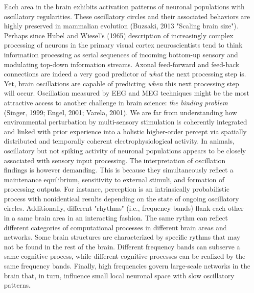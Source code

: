\documentclass[authoryear,review,3p]{elsarticle}
\begin{document}
Each area in the brain exhibits
activation patterns of neuronal populations with
oscillatory regularities.
These oscillatory circles and their associated behaviors are
highly preserved in mammalian evolution
(Buzsaki, 2013 "Scaling brain size").
%
Perhaps since Hubel and Wiesel's (1965) description of increasingly
complex processing of neurons in the primary visual cortex
neuroscientists tend to think information processing as
serial sequences of incoming bottom-up sensory and
modulating top-down information streams.
Axonal feed-forward and feed-back connections
are indeed a very good predictor of \textit{what} the next processing step is.
Yet, brain oscillations are capable of predicting \textit{when}
this next processing step will occur.
%
Oscillation measured by EEG and MEG techniques might be the most
attractive access to another challenge in brain science:
\textit{the binding problem} (Singer, 1999; Engel, 2001; Varela, 2001).
We are far from understanding how
environmental perturbation by multi-sensory stimulation
is coherently integrated and linked with prior experience into
a holistic higher-order percept via
spatially distributed and temporally coherent electrophysiological activity.
%
In animals, oscillatory but not spiking activity of neuronal populations appears
to be closely associated with sensory input processing.
The interpretation of oscillation findings is however demanding.
This is because they
simultaneously reflect
a maintenance equilibrium, sensitivity to external stimuli, and
formation of processing outputs.
For instance,
perception is an intrinsically probabilistic process with nonidentical
results depending on the state of ongoing oscillatory circles.
Additionally,
different "rhythms" (i.e., frequency bands) flank each other
in a same brain area in an interacting fashion.
The same rythm can reflect different categories of computational processes
in different brain areas and networks. Some brain structures are
characterized by specific rythms that may not be found in the rest
of the brain.
Different frequency bands can subserve a same cognitive process, while
different cognitive processes can be realized by the same frequency bands.
%
Finally,
high frequencies govern large-scale networks in the brain that, in turn,
influence small local neuronal space with slow oscillatory patterns.
\end{document}
